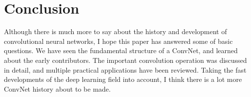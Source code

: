 
\section*{Conclusion}

Although there is much more to say about the history and development of convolutional neural networks, I hope this paper has answered some of basic questions. We have seen the fundamental structure of a ConvNet, and learned about the early contributors. The important convolution operation was discussed in detail, and multiple practical applications have been reviewed. Taking the fast developments of the deep learning field into account, I think there is a lot more ConvNet history about to be made.


